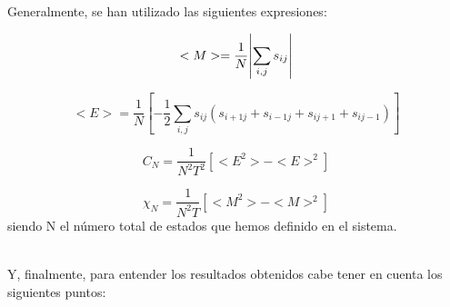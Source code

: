 \documentclass[12pt,paper]{article}
\begin{document}
\begin{itemize}
    Generalmente, se han utilizado las siguientes expresiones:
    
    \begin{equation}
        <M> = \frac{1}{N} \abs{\sum_{i,j}s_{ij}}
        \label{eq5}
    \end{equation}

    \begin{equation}
        <E> = \frac{1}{N} [- \frac{1}{2} \sum_{i,j}s_{ij}(s_{i+1j}+s_{i-1j}+s_{ij+1}+s_{ij-1})]
    \end{equation}

    \begin{equation}
        C_N = \frac{1}{N^2T^2}[<E^2>-<E>^2]
        \label{eq7}
    \end{equation}

    \begin{equation}
        \chi_N = \frac{1}{N^2T}[<M^2>-<M>^2]
    \end{equation}
    siendo N el número total de estados que hemos definido en el sistema.\\
    
\end{itemize}\\

Y, finalmente, para entender los resultados obtenidos cabe tener en cuenta los siguientes puntos:
\end{document}
